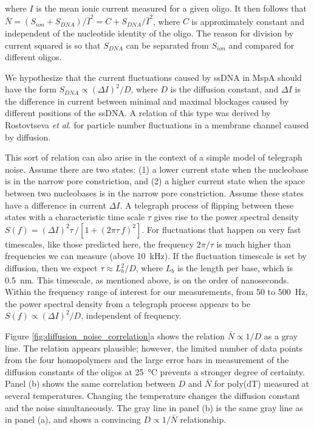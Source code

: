 \noindent
where $I$ is the mean ionic current measured for a given oligo.  It then follows that $\bar{N} = (S_{ion}+S_{DNA})/\bar{I}^2 = C + S_{DNA}/\bar{I}^2$, where $C$ is approximately constant and independent of the nucleotide identity of the oligo.  The reason for division by current squared is so that $S_{DNA}$ can be separated from $S_{ion}$ and compared for different oligos.

We hypothesize that the current fluctuations caused by ssDNA in MspA should have the form $S_{DNA} \propto (\Delta I)^2/D$, where $D$ is the diffusion constant, and $\Delta I$ is the difference in current between minimal and maximal blockages caused by different positions of the ssDNA.  A relation of this type was derived by Rostovtseva \textit{et al.} \citep{Rostovtseva1998, Berezhkovskii2002, Rostovtseva2002} for particle number fluctuations in a membrane channel caused by diffusion.

This sort of relation can also arise in the context of a simple model of telegraph noise.  Assume there are two states: (1) a lower current state when the nucleobase is in the narrow pore constriction, and (2) a higher current state when the space between two nucleobases is in the narrow pore constriction.  Assume these states have a difference in current $\Delta I$.  A telegraph process of flipping between these states with a characteristic time scale $\tau$ gives rise to the power spectral density \citep{Dutta1981} $S(f) = (\Delta I)^2 \tau \, / \left[ 1 + (2 \pi \tau \, f)^2 \right]$.  For fluctuations that happen on very fast timescales, like those predicted here, the frequency $2\pi/\tau$ is much higher than frequencies we can measure (above \SI{10}{\kHz}).  If the fluctuation timescale is set by diffusion, then we expect $\tau \approx L_b^2 / D$, where $L_b$ is the length per base, which is \SI{0.5}{\nm}.  This timescale, as mentioned above, is on the order of nanoseconds.  Within the frequency range of interest for our measurements, from \num{50} to \SI{500}{\Hz}, the power spectral density from a telegraph process appears to be $S(f) \propto (\Delta I)^2/D$, independent of frequency.

Figure \ref{fig:diffusion_noise_correlation}a shows the relation $\bar{N} \propto 1/D$ as a gray line.  The relation appears plausible; however, the limited number of data points from the four homopolymers and the large error bars in measurement of the diffusion constants of the oligos at \SI{25}{\celsius} prevents a stronger degree of certainty.  Panel (b) shows the same correlation between $D$ and $\bar{N}$ for poly(dT) measured at several temperatures.  Changing the temperature changes the diffusion constant and the noise simultaneously.  The gray line in panel (b) is the same gray line as in panel (a), and shows a convincing $D \propto 1 / \bar{N}$ relationship.

